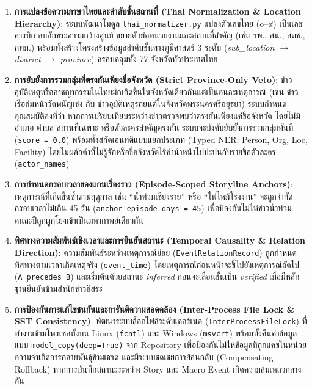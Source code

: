 \begin{enumerate}
    \item \textbf{การแปลงข้อความภาษาไทยและลำดับชั้นสถานที่ (Thai Normalization \& Location Hierarchy)}:
    ระบบพัฒนาโมดูล \texttt{thai\_normalizer.py} แปลงตัวเลขไทย (๐--๙) เป็นเลขอารบิก ลบอักขระความกว้างศูนย์ ขยายตัวย่อหน่วยงานและสถานที่สำคัญ (เช่น รพ., สน., สตช., กทม.) พร้อมทั้งสร้างโครงสร้างข้อมูลลำดับชั้นทางภูมิศาสตร์ 3 ระดับ (\textit{sub\_location $\rightarrow$ district $\rightarrow$ province}) ครอบคลุมทั้ง 77 จังหวัดทั่วประเทศไทย
    \item \textbf{การยับยั้งการรวมกลุ่มที่ตรงกันเพียงชื่อจังหวัด (Strict Province-Only Veto)}:
    ข่าวอุบัติเหตุหรืออาชญากรรมในไทยมักเกิดขึ้นในจังหวัดเดียวกันแต่เป็นคนละเหตุการณ์ (เช่น ข่าวเรือล่มหน้าวัดพนัญเชิง กับ ข่าวอุบัติเหตุรถยนต์ในจังหวัดพระนครศรีอยุธยา) ระบบกำหนดคุณสมบัติคงที่ว่า หากการเปรียบเทียบระหว่างข่าวตรวจพบว่าตรงกันเพียงแค่ชื่อจังหวัด โดยไม่มีอำเภอ ตำบล สถานที่เฉพาะ หรือตัวละครสำคัญตรงกัน ระบบจะบังคับยับยั้งการรวมกลุ่มทันที (\texttt{score = 0.0}) พร้อมทั้งสกัดเอนทิตีแบบแยกประเภท (Typed NER: Person, Org, Loc, Facility) โดยไม่ผลักคำที่ไม่รู้จักหรือชื่อจังหวัดไร้คำนำหน้าไปปะปนกับรายชื่อตัวละคร (\texttt{actor\_names})
    \item \textbf{การกำหนดกรอบเวลาของแกนเรื่องราว (Episode-Scoped Storyline Anchors)}:
    เหตุการณ์ที่เกิดขึ้นซ้ำตามฤดูกาล เช่น ``น้ำท่วมเชียงราย'' หรือ ``ไฟไหม้โรงงาน'' จะถูกจำกัดกรอบเวลาไม่เกิน 45 วัน (\texttt{anchor\_episode\_days = 45}) เพื่อป้องกันไม่ให้ข่าวน้ำท่วมคนละปีถูกผูกโยงเข้าเป็นมหากาพย์เดียวกัน
    \item \textbf{ทิศทางความสัมพันธ์เชิงเวลาและการยืนยันสถานะ (Temporal Causality \& Relation Direction)}:
    ความสัมพันธ์ระหว่างเหตุการณ์ย่อย (\texttt{EventRelationRecord}) ถูกกำหนดทิศทางตามเวลาเกิดเหตุจริง (\texttt{event\_time}) โดยเหตุการณ์ก่อนหน้าจะชี้ไปยังเหตุการณ์ถัดไป (\texttt{A precedes B}) และเริ่มต้นด้วยสถานะ \textit{inferred} ก่อนจะเลื่อนขั้นเป็น \textit{verified} เมื่อมีหลักฐานยืนยันข้ามสำนักข่าวอิสระ
    \item \textbf{การป้องกันการแก้ไขชนกันและการันตีความสอดคล้อง (Inter-Process File Lock \& SST Consistency)}:
    พัฒนาระบบล็อกไฟล์ระดับเคอร์เนล (\texttt{InterProcessFileLock}) ที่ทำงานข้ามโพรเซสทั้งบน Linux (\texttt{fcntl}) และ Windows (\texttt{msvcrt}) พร้อมทั้งคืนค่าข้อมูลแบบ \texttt{model\_copy(deep=True)} จาก Repository เพื่อป้องกันไม่ให้ข้อมูลที่ถูกแคชในหน่วยความจำเกิดการกลายพันธุ์ข้ามเธรด และมีระบบชดเชยการย้อนกลับ (Compensating Rollback) หากการบันทึกสถานะระหว่าง Story และ Macro Event เกิดความล้มเหลวกลางคัน
\end{enumerate}

